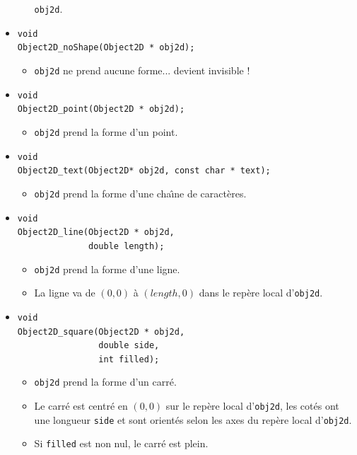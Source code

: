 \documentclass[12pt]{article}
\begin{document}
\begin{itemize}
\begin{itemize}
            \verb!obj2d!.
      \end{itemize}
\item \verb!void! \\
      \verb!Object2D_noShape(Object2D * obj2d);!
      \begin{itemize}
      \item \verb!obj2d! ne prend aucune forme... devient invisible !
      \end{itemize}
\item \verb!void! \\
      \verb!Object2D_point(Object2D * obj2d);!
      \begin{itemize}
      \item \verb!obj2d! prend la forme d'un point.
      \end{itemize}
\item \verb!void! \\
      \verb!Object2D_text(Object2D* obj2d, const char * text);!
      \begin{itemize}
      \item \verb!obj2d! prend la forme d'une cha{\^\i}ne de caract\`eres.
      \end{itemize}
\item \verb!void! \\
      \verb!Object2D_line(Object2D * obj2d,! \\
      \verb!              double length);!
      \begin{itemize}
      \item \verb!obj2d! prend la forme d'une ligne.
      \item La ligne va de $(0,0)$ \`a $(length,0)$ dans le rep\`ere local
            d'\verb!obj2d!.
      \end{itemize}
\item \verb!void! \\
      \verb!Object2D_square(Object2D * obj2d,! \\
      \verb!                double side,! \\
      \verb!                int filled);!
      \begin{itemize}
      \item \verb!obj2d! prend la forme d'un carr\'e.
      \item Le carr\'e est centr\'e en $(0,0)$ sur le rep\`ere local
            d'\verb!obj2d!, les cot\'es ont une longueur \verb!side!
            et sont orient\'es selon les axes du rep\`ere local
            d'\verb!obj2d!.
      \item Si \verb!filled! est non nul, le carr\'e est plein.

\end{itemize}
\end{itemize}
\end{document}
